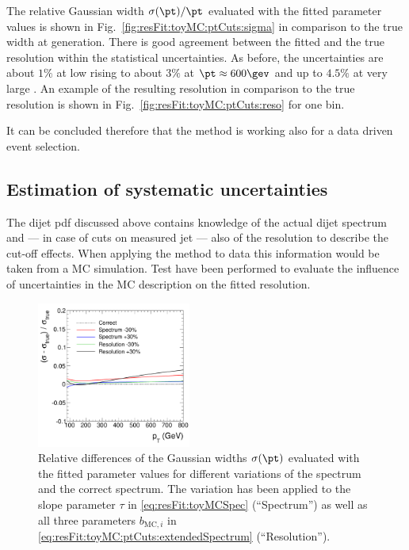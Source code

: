 \documentclass[a4paper]{cmspaper} %
\begin{document}
The relative Gaussian width $\sigma(\pt)/\pt$ evaluated with the fitted parameter values is shown in Fig.~\ref{fig:resFit:toyMC:ptCuts:sigma} in comparison to the true width at generation.
There is good agreement between the fitted and the true resolution within the statistical uncertainties.
As before, the uncertainties are about $1\%$ at low \pt rising to about $3\%$ at $\pt \approx 600\gev$ and up to $4.5\%$ at very large \pt.
An example of the resulting resolution in comparison to the true resolution is shown in Fig.~\ref{fig:resFit:toyMC:ptCuts:reso} for one \truth bin.

It can be concluded therefore that the method is working also for a data driven event selection.



\subsection{Estimation of systematic uncertainties}\label{sec:resFit:toyMC:uncert}

The dijet pdf discussed above contains knowledge of the actual dijet spectrum and --- in case of cuts on measured jet \pt --- also of the resolution to describe the cut-off effects.
When applying the method to data this information would be taken from a MC simulation.
Test have been performed to evaluate the influence of uncertainties in the MC description on the fitted resolution.

\begin{figure}[ht]
  \centering
  \includegraphics[width=0.45\textwidth]{figures/resFit_ToyMC_PtCuts_SigmaUncertainties}
  \caption{Relative differences of the Gaussian widths $\sigma(\pt)$ evaluated with the fitted parameter values for different variations of the spectrum and the correct spectrum.
    The variation has been applied to the slope parameter $\tau$ in \eqref{eq:resFit:toyMCSpec} (``Spectrum'') as well as all three parameters $b_{\text{MC},i}$ in \eqref{eq:resFit:toyMC:ptCuts:extendedSpectrum} (``Resolution'').}
  \label{fig:resFit:toyMC:uncert:systUncertainties}
\end{figure}
\end{document}
